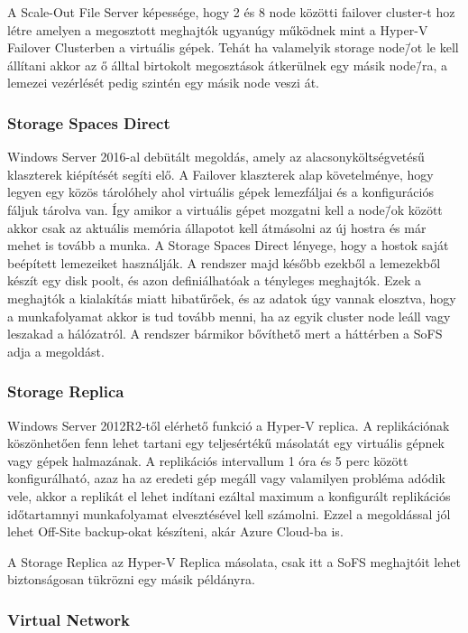 \documentclass[12pt,oneside,justify]{book}
\begin{document}
A Scale-Out File Server képessége, hogy 2 és 8 node közötti failover cluster-t hoz létre amelyen a megosztott meghajtók ugyanúgy működnek mint a Hyper-V Failover Clusterben a virtuális gépek. Tehát ha valamelyik storage node\=/ot le kell állítani akkor az ő álltal birtokolt megosztások átkerülnek egy másik node\=/ra, a lemezei vezérlését pedig szintén egy másik node veszi át.

\subsubsection{Storage Spaces Direct}

Windows Server 2016-al debütált megoldás, amely az alacsonyköltségvetésű klaszterek kiépítését segíti elő. A Failover klaszterek alap követelménye, hogy legyen egy közös tárolóhely ahol virtuális gépek lemezfáljai és a konfigurációs fáljuk tárolva van. Így amikor a virtuális gépet mozgatni kell a node\=/ok között akkor csak az aktuális memória állapotot kell átmásolni az új hostra és már mehet is tovább a munka. 
A Storage Spaces Direct lényege, hogy a hostok saját beépített lemezeiket használják. A rendszer majd később ezekből a lemezekből készít egy disk poolt, és azon definiálhatóak a tényleges meghajtók. Ezek a meghajtók a kialakítás miatt hibatűrőek, és az adatok úgy vannak elosztva, hogy a munkafolyamat akkor is tud tovább menni, ha az egyik cluster node leáll vagy leszakad a hálózatról.
A rendszer bármikor bővíthető mert a háttérben a SoFS adja a megoldást.

\subsubsection{Storage Replica}

Windows Server 2012R2-től elérhető funkció a Hyper-V replica. A replikációnak köszönhetően fenn lehet tartani egy teljesértékű másolatát egy virtuális gépnek vagy gépek halmazának. A replikációs intervallum 1 óra és 5 perc között konfigurálható, azaz ha az eredeti gép megáll vagy valamilyen probléma adódik vele, akkor a replikát el lehet indítani ezáltal maximum a konfigurált replikációs időtartamnyi munkafolyamat elvesztésével kell számolni. Ezzel a megoldással jól lehet Off-Site backup-okat készíteni, akár Azure Cloud-ba is.

A Storage Replica az Hyper-V Replica másolata, csak itt a SoFS meghajtóit lehet biztonságosan tükrözni egy másik példányra.

\subsubsection{Virtual Network}
\end{document}
